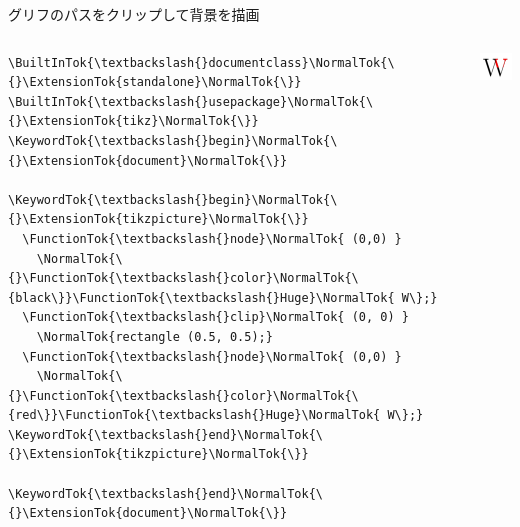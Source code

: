 \documentclass[unicode,14pt]{beamer}
\begin{document}
\begin{frame}[fragile]{グリフのパスをクリップして背景を描画}
  \sffamily
  \vspace*{-\baselineskip}
  \begin{columns}[t]
    \begin{column}{.5\textwidth}
  \begin{tcolorbox}
  \begin{Verbatim}[commandchars=\\\{\}, breaklines=true, breakanywhere=true]
\BuiltInTok{\textbackslash{}documentclass}\NormalTok{\{}\ExtensionTok{standalone}\NormalTok{\}}
\BuiltInTok{\textbackslash{}usepackage}\NormalTok{\{}\ExtensionTok{tikz}\NormalTok{\}}
\KeywordTok{\textbackslash{}begin}\NormalTok{\{}\ExtensionTok{document}\NormalTok{\}}

\KeywordTok{\textbackslash{}begin}\NormalTok{\{}\ExtensionTok{tikzpicture}\NormalTok{\}}
  \FunctionTok{\textbackslash{}node}\NormalTok{ (0,0) }
    \NormalTok{\{}\FunctionTok{\textbackslash{}color}\NormalTok{\{black\}}\FunctionTok{\textbackslash{}Huge}\NormalTok{ W\};}
  \FunctionTok{\textbackslash{}clip}\NormalTok{ (0, 0) }
    \NormalTok{rectangle (0.5, 0.5);}
  \FunctionTok{\textbackslash{}node}\NormalTok{ (0,0) }
    \NormalTok{\{}\FunctionTok{\textbackslash{}color}\NormalTok{\{red\}}\FunctionTok{\textbackslash{}Huge}\NormalTok{ W\};}
\KeywordTok{\textbackslash{}end}\NormalTok{\{}\ExtensionTok{tikzpicture}\NormalTok{\}}

\KeywordTok{\textbackslash{}end}\NormalTok{\{}\ExtensionTok{document}\NormalTok{\}}
  \end{Verbatim}
  \end{tcolorbox}
    \end{column}
    \begin{column}{.5\textwidth}
  \begin{center}
    \mbox{}
    \vfill
    \includegraphics[width=.75\textwidth]{figures/wclip.pdf}
    \vfill
  \end{center}
    \end{column}
  \end{columns}
\end{frame}
\end{document}

